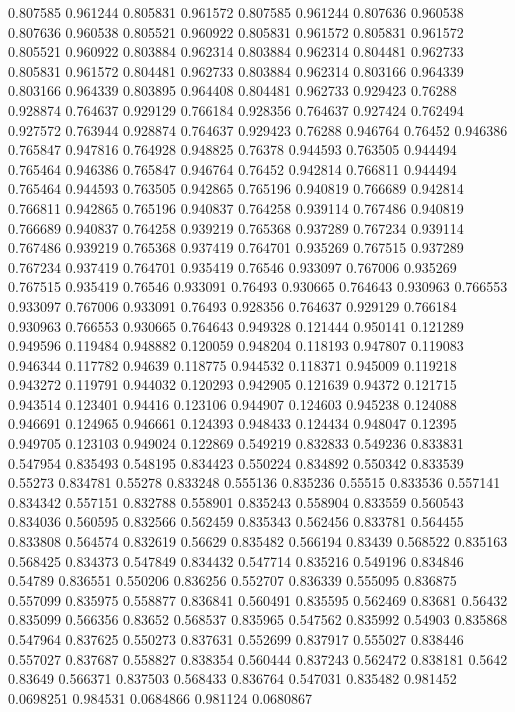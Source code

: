 0.807585 0.961244
0.805831 0.961572
0.807585 0.961244
0.807636 0.960538
0.807636 0.960538
0.805521 0.960922
0.805831 0.961572
0.805831 0.961572
0.805521 0.960922
0.803884 0.962314
0.803884 0.962314
0.804481 0.962733
0.805831 0.961572
0.804481 0.962733
0.803884 0.962314
0.803166 0.964339
0.803166 0.964339
0.803895 0.964408
0.804481 0.962733
0.929423 0.76288
0.928874 0.764637
0.929129 0.766184
0.928356 0.764637
0.927424 0.762494
0.927572 0.763944
0.928874 0.764637
0.929423 0.76288
0.946764 0.76452
0.946386 0.765847
0.947816 0.764928
0.948825 0.76378
0.944593 0.763505
0.944494 0.765464
0.946386 0.765847
0.946764 0.76452
0.942814 0.766811
0.944494 0.765464
0.944593 0.763505
0.942865 0.765196
0.940819 0.766689
0.942814 0.766811
0.942865 0.765196
0.940837 0.764258
0.939114 0.767486
0.940819 0.766689
0.940837 0.764258
0.939219 0.765368
0.937289 0.767234
0.939114 0.767486
0.939219 0.765368
0.937419 0.764701
0.935269 0.767515
0.937289 0.767234
0.937419 0.764701
0.935419 0.76546
0.933097 0.767006
0.935269 0.767515
0.935419 0.76546
0.933091 0.76493
0.930665 0.764643
0.930963 0.766553
0.933097 0.767006
0.933091 0.76493
0.928356 0.764637
0.929129 0.766184
0.930963 0.766553
0.930665 0.764643
0.949328 0.121444
0.950141 0.121289
0.949596 0.119484
0.948882 0.120059
0.948204 0.118193
0.947807 0.119083
0.946344 0.117782
0.94639 0.118775
0.944532 0.118371
0.945009 0.119218
0.943272 0.119791
0.944032 0.120293
0.942905 0.121639
0.94372 0.121715
0.943514 0.123401
0.94416 0.123106
0.944907 0.124603
0.945238 0.124088
0.946691 0.124965
0.946661 0.124393
0.948433 0.124434
0.948047 0.12395
0.949705 0.123103
0.949024 0.122869
0.549219 0.832833
0.549236 0.833831
0.547954 0.835493
0.548195 0.834423
0.550224 0.834892
0.550342 0.833539
0.55273 0.834781
0.55278 0.833248
0.555136 0.835236
0.55515 0.833536
0.557141 0.834342
0.557151 0.832788
0.558901 0.835243
0.558904 0.833559
0.560543 0.834036
0.560595 0.832566
0.562459 0.835343
0.562456 0.833781
0.564455 0.833808
0.564574 0.832619
0.56629 0.835482
0.566194 0.83439
0.568522 0.835163
0.568425 0.834373
0.547849 0.834432
0.547714 0.835216
0.549196 0.834846
0.54789 0.836551
0.550206 0.836256
0.552707 0.836339
0.555095 0.836875
0.557099 0.835975
0.558877 0.836841
0.560491 0.835595
0.562469 0.83681
0.56432 0.835099
0.566356 0.83652
0.568537 0.835965
0.547562 0.835992
0.54903 0.835868
0.547964 0.837625
0.550273 0.837631
0.552699 0.837917
0.555027 0.838446
0.557027 0.837687
0.558827 0.838354
0.560444 0.837243
0.562472 0.838181
0.5642 0.83649
0.566371 0.837503
0.568433 0.836764
0.547031 0.835482
0.981452 0.0698251
0.984531 0.0684866
0.981124 0.0680867

